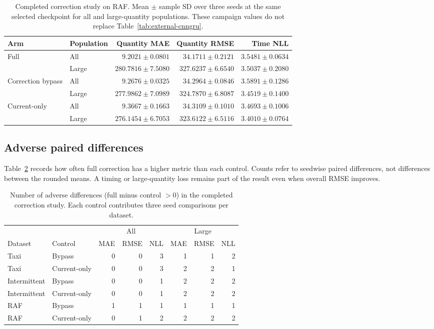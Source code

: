 \documentclass[runningheads]{llncs}
\begin{document}
\begin{table}[htbp]
\caption{Completed correction study on RAF. Mean $\pm$ sample SD over three seeds at the same selected checkpoint for all and large-quantity populations. These campaign values do not replace Table~\ref{tab:external-cnngru}.}
\label{tab:history-six-raf_spare_parts}
\centering\small
\setlength{\tabcolsep}{3pt}
\renewcommand{\arraystretch}{1.12}
\begin{tabular}{@{}llrrr@{}}
\toprule
Arm & Population & Quantity MAE & Quantity RMSE & Time NLL\\
\midrule
Full & All & $9.2021\pm0.0801$ & $34.1711\pm0.2121$ & $3.5481\pm0.0634$\\
 & Large & $280.7816\pm7.5080$ & $327.6237\pm6.6540$ & $3.5037\pm0.2080$\\
\midrule
Correction bypass & All & $9.2676\pm0.0325$ & $34.2964\pm0.0846$ & $3.5891\pm0.1286$\\
 & Large & $277.9862\pm7.0989$ & $324.7870\pm6.8087$ & $3.4519\pm0.1400$\\
\midrule
Current-only & All & $9.3667\pm0.1663$ & $34.3109\pm0.1010$ & $3.4693\pm0.1006$\\
 & Large & $276.1454\pm6.7053$ & $323.6122\pm6.5116$ & $3.4010\pm0.0764$\\
\bottomrule
\end{tabular}
\end{table}

\clearpage
\subsection{Adverse paired differences}
Table~\ref{tab:history-adverse} records how often full correction has a higher metric than each control. Counts refer to seedwise paired differences, not differences between the rounded means. A timing or large-quantity loss remains part of the result even when overall RMSE improves.

\begin{table}[htbp]
\caption{Number of adverse differences (full minus control $>0$) in the completed correction study. Each control contributes three seed comparisons per dataset.}
\label{tab:history-adverse}
\centering\small
\setlength{\tabcolsep}{3pt}
\begin{tabular}{@{}llrrrrrr@{}}
\toprule
 & & \multicolumn{3}{c}{All} & \multicolumn{3}{c}{Large}\\
\cmidrule(lr){3-5}\cmidrule(l){6-8}
Dataset & Control & MAE & RMSE & NLL & MAE & RMSE & NLL\\
\midrule
Taxi & Bypass & 0 & 0 & 3 & 1 & 1 & 2\\
Taxi & Current-only & 0 & 0 & 3 & 2 & 2 & 1\\
\midrule
Intermittent & Bypass & 0 & 0 & 1 & 2 & 2 & 2\\
Intermittent & Current-only & 0 & 0 & 1 & 2 & 2 & 2\\
\midrule
RAF & Bypass & 1 & 1 & 1 & 1 & 1 & 1\\
RAF & Current-only & 0 & 1 & 2 & 2 & 2 & 2\\
\bottomrule
\end{tabular}
\end{table}
\end{document}
